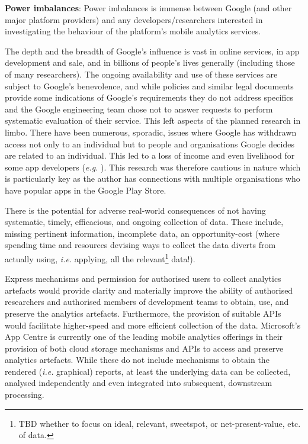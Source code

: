 \textbf{Power imbalances}: 
Power imbalances is immense between Google (and other major platform providers) and any developers/researchers interested in investigating the behaviour of the platform's mobile analytics services.

The depth and the breadth of Google's influence is vast in online services, in app development and sale, and in billions of people's lives generally (including those of many researchers). The ongoing availability and use of these services are subject to Google's benevolence, and while policies and similar legal documents provide some indications of Google's requirements they do not address specifics and the Google engineering team chose not to answer requests to perform systematic evaluation of their service. This left aspects of the planned research in limbo. There have been numerous, sporadic, issues where Google has withdrawn access not only to an individual but to people and organisations Google decides are related to an individual. This led to a loss of income and even livelihood for some app developers (\textit{e.g.} ). This research was therefore cautious in nature which is particularly key as the author has connections with multiple organisations who have popular apps in the Google Play Store. 

There is the potential for adverse real-world consequences of not having systematic, timely, efficacious, and ongoing collection of data. These include, missing pertinent information, incomplete data, an opportunity-cost (where spending time and resources devising ways to collect the data diverts from actually using, \textit{i.e.} applying, all the relevant\footnote{TBD whether to focus on ideal, relevant, sweetspot, or net-present-value, etc. of data.} data!). 

Express mechanisms and permission for authorised users to collect analytics artefacts would provide clarity and materially improve the ability of authorised researchers and authorised members of development teams to obtain, use, and preserve the analytics artefacts. Furthermore, the provision of suitable APIs would facilitate higher-speed and more efficient collection of the data. Microsoft's App Centre is currently one of the leading mobile analytics offerings in their provision of both cloud storage mechanisms and APIs to access and preserve analytics artefacts. While these do not include mechanisms to obtain the rendered (\textit{i.e.} graphical) reports, at least the underlying data can be collected, analysed independently and even integrated into subsequent, downstream processing.  


